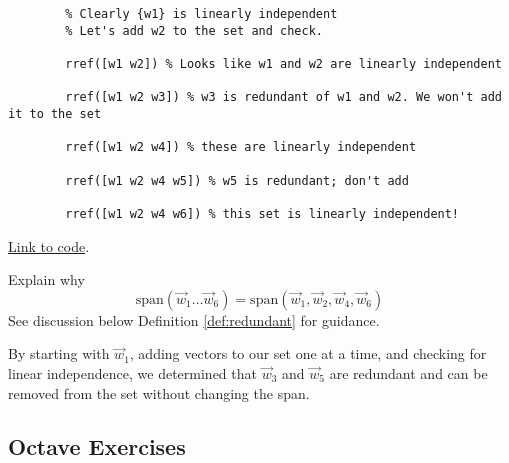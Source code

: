 \documentclass{ximera}
\begin{document}
\begin{example}
\begin{explanation}
\begin{verbatim}
        % Clearly {w1} is linearly independent
        % Let's add w2 to the set and check.

        rref([w1 w2]) % Looks like w1 and w2 are linearly independent

        rref([w1 w2 w3]) % w3 is redundant of w1 and w2. We won't add it to the set

        rref([w1 w2 w4]) % these are linearly independent

        rref([w1 w2 w4 w5]) % w5 is redundant; don't add

        rref([w1 w2 w4 w6]) % this set is linearly independent!
    \end{verbatim}

        \href{https://sagecell.sagemath.org/?z=eJyNjz1rwzAURXeD_8NdQprBIfJXUoSnduzewXgw1jMxNnKQlYhQ-t_7pFDa0BYKRsPRvUfXKzxTP2iCPRIu1NnZLBi0Gi6DOrfTdI2jOHKiqkUqIXYSScpH0UimaVVnDEQukQq-FYFmVZ2UjLODROlL-4DzquZc4rNcEo8BFrcsf_leItsFWFa1r3kjw4NncbTC00Stma54c-Idw4KJVwfAa-lEfGjrcy9k1wtapeBS2Dn82EIWrVbojtSNW-8zhvqH2gkONRtwa55H7xwJDH2W262hP565E8BlweEyv8uQOmvVaou5_3Jt8crmWa9tmDbYb9N-6PKg49uF_r8hhytuM4q7GRLq89nfOmWz-QDgyJSO&lang=octave&interacts=eJyLjgUAARUAuQ==}{Link to code}.

        \begin{question}
        Explain why $$\text{span}(\vec{w}_1\dots\vec{w}_6)=\text{span}(\vec{w}_1, \vec{w}_2, \vec{w}_4, \vec{w}_6)$$
        See discussion below Definition \ref{def:redundant} for guidance.
        \end{question}

        By starting with $\vec{w}_1$, adding vectors to our set one at a time, and checking for linear independence, we determined that $\vec{w}_3$ and $\vec{w}_5$ are redundant and can be removed from the set without changing the span.

    \end{explanation}
\end{example}

\subsection*{Octave Exercises}
\end{document}
